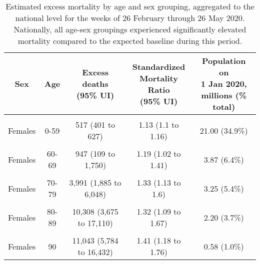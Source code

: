 \documentclass[
]{article}
\begin{document}
\begin{table}[!h]

\caption{\label{tab:excess-demographics}Estimated excess mortality by age and sex grouping, aggregated to the national level for the weeks of 26 February through 26 May 2020. Nationally, all age-sex groupings experienced significantly elevated mortality compared to the expected baseline during this period.}
\centering
\begin{tabular}[t]{ccccc}
\toprule
Sex & Age & \makecell[c]{Excess deaths\\(95\% UI)} & \makecell[c]{Standardized\\Mortality Ratio\\(95\% UI)} & \makecell[c]{Population on\\1 Jan 2020,\\millions (\% total)}\\
\midrule
\cellcolor{gray!6}{Males} & \cellcolor{gray!6}{0-59} & \cellcolor{gray!6}{1,081 (918 to 1,240)} & \cellcolor{gray!6}{1.16 (1.13 to 1.19)} & \cellcolor{gray!6}{21.37 (35.5\%)}\\
Females & 0-59 & 517 (401 to 627) & 1.13 (1.1 to 1.16) & 21.00 (34.9\%)\\
\cellcolor{gray!6}{Males} & \cellcolor{gray!6}{60-69} & \cellcolor{gray!6}{2,600 (1,152 to 3,990)} & \cellcolor{gray!6}{1.29 (1.11 to 1.52)} & \cellcolor{gray!6}{3.55 (5.9\%)}\\
Females & 60-69 & 947 (109 to 1,750) & 1.19 (1.02 to 1.41) & 3.87 (6.4\%)\\
\cellcolor{gray!6}{Males} & \cellcolor{gray!6}{70-79} & \cellcolor{gray!6}{7,703 (4,639 to 10,730)} & \cellcolor{gray!6}{1.42 (1.22 to 1.71)} & \cellcolor{gray!6}{2.75 (4.6\%)}\\
\addlinespace
Females & 70-79 & 3,991 (1,885 to 6,048) & 1.33 (1.13 to 1.6) & 3.25 (5.4\%)\\
\cellcolor{gray!6}{Males} & \cellcolor{gray!6}{80-89} & \cellcolor{gray!6}{10,649 (4,574 to 16,946)} & \cellcolor{gray!6}{1.36 (1.13 to 1.72)} & \cellcolor{gray!6}{1.45 (2.4\%)}\\
Females & 80-89 & 10,308 (3,675 to 17,110) & 1.32 (1.09 to 1.67) & 2.20 (3.7\%)\\
\cellcolor{gray!6}{Males} & \cellcolor{gray!6}{90} & \cellcolor{gray!6}{4,405 (1,979 to 6,879)} & \cellcolor{gray!6}{1.36 (1.14 to 1.71)} & \cellcolor{gray!6}{0.22 (0.4\%)}\\
Females & 90 & 11,043 (5,784 to 16,432) & 1.41 (1.18 to 1.76) & 0.58 (1.0\%)\\
\bottomrule
\end{tabular}
\end{table}
\newpage
\end{document}

